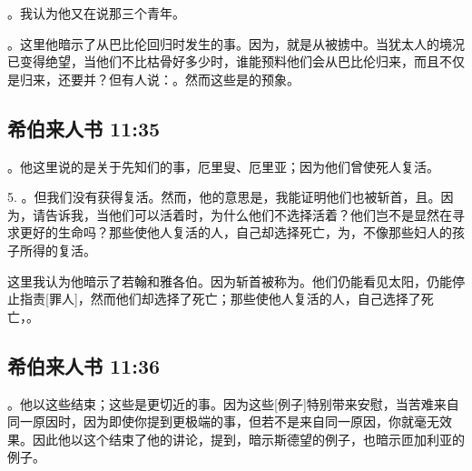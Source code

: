 。我认为他又在说那三个青年。\par

。这里他暗示了从巴比伦回归时发生的事。因为，就是从被掳中。当犹太人的境况已变得绝望，当他们不比枯骨好多少时，谁能预料他们会从巴比伦归来，而且不仅是归来，还要并？但有人说：。然而这些是的预象。\par


\subsection{希伯来人书 11:35}

。他这里说的是关于先知们的事，厄里叟、厄里亚；因为他们曾使死人复活。\par

5. 。但我们没有获得复活。然而，他的意思是，我能证明他们也被斩首，且。因为，请告诉我，当他们可以活着时，为什么他们不选择活着？他们岂不是显然在寻求更好的生命吗？那些使他人复活的人，自己却选择死亡，为，不像那些妇人的孩子所得的复活。\par

这里我认为他暗示了若翰和雅各伯。因为斩首被称为。他们仍能看见太阳，仍能停止指责[罪人]，然而他们却选择了死亡；那些使他人复活的人，自己选择了死亡，。\par


\subsection{希伯来人书 11:36}

。他以这些结束；这些是更切近的事。因为这些[例子]特别带来安慰，当苦难来自同一原因时，因为即使你提到更极端的事，但若不是来自同一原因，你就毫无效果。因此他以这个结束了他的讲论，提到，暗示斯德望的例子，也暗示匝加利亚的例子。\par

